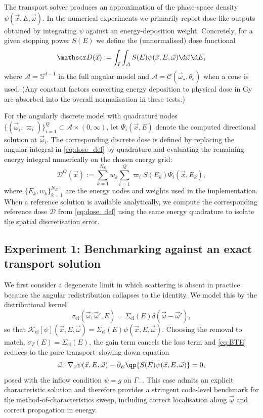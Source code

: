\documentclass[final]{amsart}
\begin{document}
The transport solver produces an approximation of the phase-space
density $\psi(\vec x,E,\vec\omega)$. In the numerical experiments we
primarily report dose-like outputs obtained by integrating $\psi$ against
an energy-deposition weight. Concretely, for a given stopping power
$S(E)$ we define the (unnormalised) dose functional
\begin{equation}
  \label{eq:dose_def}
  \mathscr D(\vec x)
  :=
  \int_{I}\int_{\mathcal A} S(E) \psi(\vec x,E,\vec\omega) \d\vec\omega \d E,
\end{equation}
where $\mathcal A=\mathbb S^{d-1}$ in the full angular model and
$\mathcal A=\mathcal C(\vec\omega_\star,\theta_c)$ when a cone is used.
(Any constant factors converting energy deposition to physical dose in
Gy are absorbed into the overall normalisation in these tests.)

For the angularly discrete model with quadrature nodes
$\{(\vec\omega_i,\varpi_i)\}_{i=1}^Q\subset\mathcal A\times(0,\infty)$, let
$\Psi_i(\vec x,E)$ denote the computed directional solution at
$\vec\omega_i$. The corresponding discrete dose is defined by replacing
the angular integral in \eqref{eq:dose_def} by quadrature and evaluating
the remaining energy integral numerically on the chosen energy grid:
\begin{equation}
  \label{eq:dose_discrete}
  \mathscr D^{Q}(\vec x)
  :=
  \sum_{k=1}^{N_E} w_k \sum_{i=1}^Q \varpi_i  S(E_k) \Psi_i(\vec x,E_k),
\end{equation}
where $\{E_k,w_k\}_{k=1}^{N_E}$ are the energy nodes and weights used in
the implementation. When a reference solution is available analytically,
we compute the corresponding reference dose $\mathscr D$ from \eqref{eq:dose_def}
using the same energy quadrature to isolate the spatial discretisation
error.

\subsection{Experiment 1: Benchmarking against an exact transport solution}
\label{exp1:benchmark}

We first consider a degenerate limit in which scattering is absent in
practice because the angular redistribution collapses to the identity. We
model this by the distributional kernel
\begin{equation}
  \label{eq:dirac_scattering}
  \sigma_{\mathrm{el}}(\vec{\omega},\vec{\omega}',E)
  =
  \Sigma_{\mathrm{el}}(E) \delta(\vec{\omega}-\vec{\omega}'),
\end{equation}
so that
$\mathcal{K}_{\mathrm{el}}[\psi](\vec{x},E,\vec{\omega})
=\Sigma_{\mathrm{el}}(E) \psi(\vec{x},E,\vec{\omega})$. Choosing the
removal to match, $\sigma_T(E)=\Sigma_{\mathrm{el}}(E)$, the gain term
cancels the loss term and \eqref{eq:BTE} reduces to the pure
transport--slowing-down equation
\[
  \vec{\omega}\cdot\nabla_{\vec{x}}\psi(\vec{x},E,\vec{\omega})
  -
  \partial_E\qp{S(E)\psi(\vec{x},E,\vec{\omega})}
  =
  0,
\]
posed with the inflow condition $\psi=g$ on $\Gamma_-$. This case admits
an explicit characteristic solution and therefore provides a stringent
code-level benchmark for the method-of-characteristics sweep, including
correct localisation along $\vec{\omega}$ and correct propagation in
energy.
\end{document}

